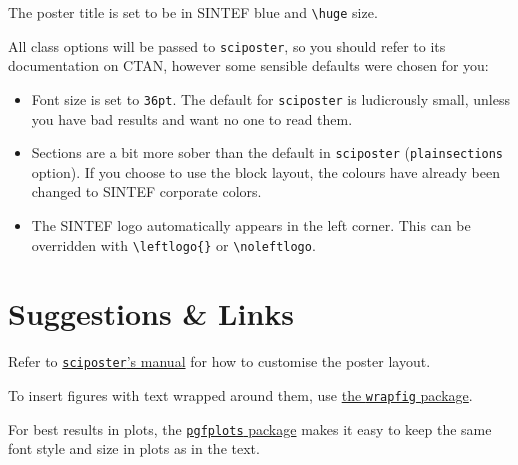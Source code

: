 \documentclass{sintefposter}
\begin{document}
\begin{multicols}{3}
The poster title is set to be in SINTEF blue and \verb|\huge| size.

All class options will be passed to \texttt{sciposter}, so you should refer to
its documentation on CTAN, however some sensible defaults were chosen for you:
\begin{itemize}
  \item Font size is set to \texttt{36pt}. The default for \texttt{sciposter} is
        ludicrously small, unless you have bad results and want no one to read
        them.
  \item Sections are a bit more sober than the default in \texttt{sciposter}
        (\texttt{plainsections} option).
        If you choose to use the block layout, the colours have already been
        changed to SINTEF corporate colors.
  \item The SINTEF logo automatically appears in the left corner.
        This can be overridden with \verb|\leftlogo{}| or \verb|\noleftlogo|.
\end{itemize}

\section*{Suggestions \& Links}
Refer to
\href{http://mirrors.ctan.org/macros/latex/contrib/sciposter/scipostermanual.pdf}
{\texttt{sciposter}'s manual} for how to customise the poster layout.

To insert figures with text wrapped around them, use
\href{http://mirrors.ctan.org/macros/latex/contrib/wrapfig/wrapfig-doc.pdf}{the
\texttt{wrapfig} package}.

For best results in plots, the
\href{http://mirrors.ctan.org/graphics/pgf/contrib/pgfplots/doc/latex/pgfplots/pgfplots.pdf}
{\texttt{pgfplots} package} makes it easy to keep the same font style and size
in plots as in the text.

\end{multicols}
\end{document}
